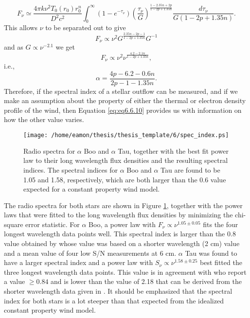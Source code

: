 \begin{equation}
F_{\nu} \simeq \frac{4\pi k\nu^2T_{0}(r_{0})r_{0}^{n}}{D^2c^2}\int ^{\infty}_{0}(1-e^{-\tau _{\nu}})\left(\frac{\tau _{\nu}}{G} \right)^{\frac{1-2.35n +2p}{1-2p +1.35n}}\frac{d\tau _{\nu}}{G(1-2p + 1.35n)}.
\label{eq:eq6.6.7}
\end{equation}
This allows $\nu$ to be separated out to give
\begin{equation}
F_{\nu} \propto \nu^2 G^{\frac{2.35n -2p -1}{1-2p +1.35n}} G^{-1}
\label{eq:eq6.6.8}
\end{equation}
and as $G \propto \nu^{-2.1}$ we get
\begin{equation}
F_{\nu} \propto \nu^2 \nu^{\frac{4.2-2.1n}{1-2p +1.35n}},
\label{eq:eq6.6.9}
\end{equation}
i.e.,
\begin{equation}
\alpha = \frac{4p -6.2 -0.6n}{2p-1-1.35n}.
\label{eq:eq6.6.10}
\end{equation}
Therefore, if the spectral index of a stellar outflow can be measured, and if we make an assumption about the property of either the thermal or electron density profile of the wind, then Equation \ref{eq:eq6.6.10} provides us with information on how the other value varies.

\begin{figure}[hbt!]
\centering 
          \texttt{[image: /home/eamon/thesis/thesis\_template/6/spec\_index.ps]}
\caption[Power law fits to the spectra of $\alpha$ Boo and $\alpha$ Tau.]{Radio spectra for $\alpha$ Boo and $\alpha$ Tau, together with the best fit power law to their long wavelength flux densities and the resulting spectral indices. The spectral indices for $\alpha$ Boo and $\alpha$ Tau are found to be 1.05 and 1.58, respectively, which are both larger than the 0.6 value expected for a constant property wind model.}
\label{fig6.6.1}
\end{figure}

The radio spectra for both stars are shown in Figure \ref{fig6.6.1}, together with the power laws that were fitted to the long wavelength flux densities by minimizing the chi-square error statistic. For $\alpha$ Boo, a power law with $F_{\nu} \propto \nu ^{1.05 \pm 0.05}$ fits the four longest wavelength data points well. This spectral index is larger than the 0.8 value obtained by \cite{drake_1986} whose value was based on a shorter wavelength (2 cm) value and a mean value of four low S/N measurements at 6 cm. $\alpha$ Tau was found to have a larger spectral index and a power law with $S_{\nu} \propto \nu ^{1.58 \pm 0.25}$ best fitted the three longest wavelength data points. This value is in agreement with \cite{drake_1986} who report a value $\ge 0.84$ and is lower than the value of 2.18 that can be derived from the shorter wavelength data given in \cite{wood_2007}. It should be emphasized that the spectral index for both stars is a lot steeper than that expected from the idealized constant property wind model. 

